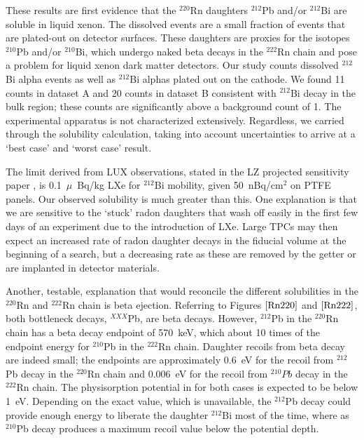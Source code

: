 These results are first evidence that the $^{220}$Rn daughters $^{212}$Pb and/or $^{212}$Bi are soluble in liquid xenon. The dissolved events are a small fraction of events that are plated-out on detector surfaces. These daughters are proxies for the isotopes $^{210}$Pb and/or $^{210}$Bi, which undergo naked beta decays in the $^{222}$Rn chain and pose a problem for liquid xenon dark matter detectors. Our study counts dissolved $^{212}$Bi alpha events as well as $^{212}$Bi alphas plated out on the cathode. We found 11 counts in dataset A and 20 counts in dataset B consistent with $^{212}$Bi decay in the bulk region; these counts are significantly above a background count of 1. The experimental apparatus is not characterized extensively. Regardless, we carried through the solubility calculation, taking into account uncertainties to arrive at a `best case' and `worst case' result. 

The limit derived from LUX observations, stated in the LZ projected sensitivity paper \cite{LZ:Sensitivity}, is 0.1~$\mu$~Bq/kg LXe for $^{212}$Bi mobility, given 50~nBq/cm$^{2}$ on PTFE panels. Our observed solubility is much greater than this. One explanation is that we are sensitive to the `stuck' radon daughters that wash off easily in the first few days of an experiment due to the introduction of \ac{LXe}. Large TPCs may then expect an increased rate of radon daughter decays in the fiducial volume at the beginning of a search, but a decreasing rate as these are removed by the getter or are implanted in detector materials. 

Another, testable, explanation that would reconcile the different solubilities in the $^{220}$Rn and $^{222}$Rn chain is beta ejection. Referring to Figures $\ref{Rn220}$ and $\ref{Rn222}$, both bottleneck decays, $^{XXX}$Pb, are beta decays. However, $^{212}$Pb in the $^{220}$Rn chain has a beta decay endpoint of 570~keV, which about 10 times of the endpoint energy for $^{210}$Pb in the $^{222}$Rn chain. Daughter recoils from beta decay are indeed small; the endpoints are approximately 0.6~eV for the recoil from $^{212}$Pb decay in the $^{220}$Rn chain and  0.006~eV for the recoil from $^{210}Pb$ decay in the $^{222}$Rn chain. The physisorption potential in for both cases is expected to be below 1~eV. Depending on the exact value, which is unavailable, the $^{212}$Pb decay could provide enough energy to liberate the daughter $^{212}$Bi most of the time, where as $^{210}$Pb decay produces a maximum recoil value below the potential depth. 

